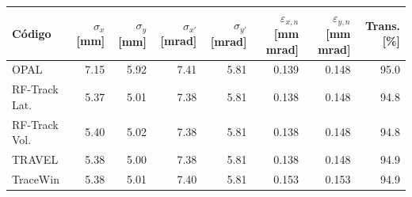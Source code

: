 \begin{tabular}{lrrrrrrr}
\toprule
Código & $\sigma_x$ [mm] & $\sigma_y$ [mm] & $\sigma_{x'}$ [mrad] & $\sigma_{y'}$ [mrad] & $\varepsilon_{x,n}$ [mm mrad] & $\varepsilon_{y,n}$ [mm mrad] & Trans. [\%] \\
\midrule
OPAL & 7.15 & 5.92 & 7.41 & 5.81 & 0.139 & 0.148 & 95.0 \\
RF-Track Lat. & 5.37 & 5.01 & 7.38 & 5.81 & 0.138 & 0.148 & 94.8 \\
RF-Track Vol. & 5.40 & 5.02 & 7.38 & 5.81 & 0.138 & 0.148 & 94.8 \\
TRAVEL & 5.38 & 5.00 & 7.38 & 5.81 & 0.138 & 0.148 & 94.9 \\
TraceWin & 5.38 & 5.01 & 7.40 & 5.81 & 0.153 & 0.153 & 94.9 \\
\bottomrule
\end{tabular}
